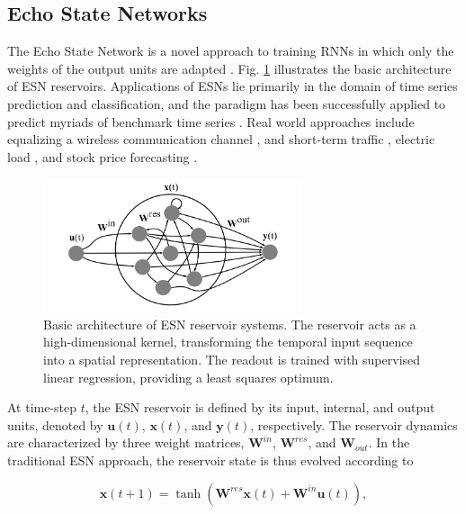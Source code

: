\subsection{Echo State Networks}

The Echo State Network is a novel approach to training RNNs in which only the
weights of the output units are adapted \cite{jaeger_echo_2001}. Fig. \ref{esn}
illustrates the basic architecture of ESN reservoirs. Applications of ESNs lie
primarily in the domain of time series prediction and classification, and the
paradigm has been successfully applied to predict myriads of benchmark time
series \cite{goudarzi_comparative_2014, alippi_quantification_2009,
rodan_minimum_2011}. Real world approaches include equalizing a wireless
communication channel \cite{jaeger_harnessing_2004}, and short-term traffic
\cite{an_short-term_2011}, electric load \cite{song_hourly_2011}, and stock
price forecasting \cite{lin_short-term_2009}.

\begin{figure}[t!]
  \centering
  \includegraphics[width=3.0in]{img/esn.png}
  \caption{
    Basic architecture of ESN reservoir systems. The reservoir acts as a
high-dimensional kernel, transforming the temporal input sequence into a spatial
representation. The readout is trained with supervised linear regression,
providing a least squares optimum.
  }
  \label{esn}
\end{figure}

At time-step $t$, the ESN reservoir is defined by its input, internal, and
output units, denoted by $\mathbf{u}(t)$, $\mathbf{x}(t)$, and $\mathbf{y}(t)$,
respectively. The reservoir dynamics are characterized by three weight matrices,
$\mathbf{W}^{in}$, $\mathbf{W}^{res}$, and $\mathbf{W}_{out}$. In the
traditional ESN approach, the reservoir state is thus evolved according to

\begin{equation}
  \mathbf{x}(t + 1) =
    \tanh(\mathbf{W}^{res}\mathbf{x}(t)
        + \mathbf{W}^{in}\mathbf{u}(t)),
  \label{xt}
\end{equation}

